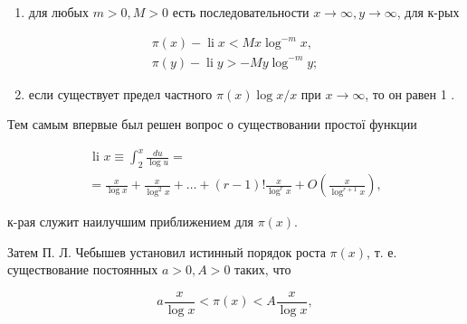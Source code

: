 \documentclass[10pt]{article}
\begin{document}
\begin{enumerate}

  \item для любых $m>0, M>0$ есть последовательности $x \rightarrow \infty, y \rightarrow \infty$, для к-рых

\end{enumerate}



\[

\begin{gathered}

\pi(x)-\operatorname{li} x<M x \log ^{-m} x, \\

\pi(y)-\operatorname{li} y>-M y \log ^{-m} y ;

\end{gathered}

\]



\begin{enumerate}

  \setcounter{enumi}{1}

  \item если существует предел частного $\pi(x) \log x / x$ при $x \rightarrow \infty$, то он равен 1 .

\end{enumerate}



Тем самым впервые был решен вопрос о существовании простої функции



\[

\begin{gathered}

\text { li } x \equiv \int_{2}^{x} \frac{d u}{\log u}= \\

=\frac{x}{\log x}+\frac{x}{\log ^{2} x}+\ldots+(r-1) ! \frac{x}{\log ^{r} x}+O\left(\frac{x}{\log ^{r+1} x}\right),

\end{gathered}

\]



к-рая служит наилучшим приближением для $\pi(x)$.



Затем П. Л. Чебышев установил истинный порядок роста $\pi(x)$, т. е. существование постоянных $a>0, A>0$ таких, что



\[

a \frac{x}{\log x}<\pi(x)<A \frac{x}{\log x},

\]
\end{document}
